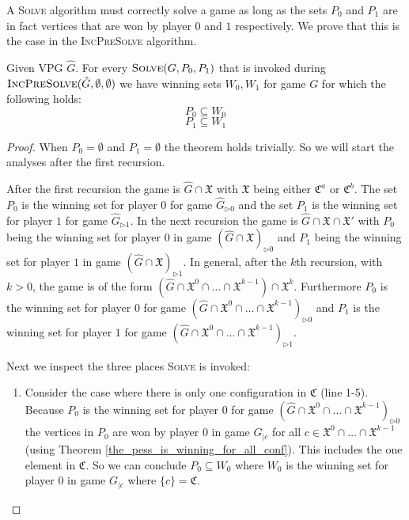 A \textsc{Solve} algorithm must correctly solve a game as long as the sets $P_0$ and $P_1$ are in fact vertices that are won by player $0$ and $1$ respectively. We prove that this is the case in the \textsc{IncPreSolve} algorithm.
\begin{theorem}
	Given VPG $\hat{G}$. For every $\textsc{Solve}(G,P_0,P_1)$ that is invoked during $\textsc{IncPreSolve}(\hat{G},\emptyset,\emptyset)$ we have winning sets $W_0,W_1$ for game $G$ for which the following holds:
	\[ P_0 \subseteq  W_0 \]
	\[ P_1 \subseteq  W_1 \]
	\begin{proof}
		When $P_0 = \emptyset$ and $P_1 = \emptyset$ the theorem holds trivially. So we will start the analyses after the first recursion. 
		
		After the first recursion the game is $\hat{G} \cap \mathfrak{X}$ with $\mathfrak{X}$ being either $\mathfrak{C}^a$ or $\mathfrak{C}^b$. The set $P_0$ is the winning set for player $0$ for game $\hat{G}_{\triangleright0}$ and the set $P_1$ is the winning set for player $1$ for game $\hat{G}_{\triangleright1}$. In the next recursion the game is $\hat{G} \cap \mathfrak{X} \cap \mathfrak{X}'$ with $P_0$ being the winning set for player $0$ in game $(\hat{G} \cap \mathfrak{X})_{\triangleright0}$ and $P_1$ being the winning set for player $1$ in game $(\hat{G} \cap \mathfrak{X})_{\triangleright1}$. In general, after the $k$th recursion, with $k > 0$, the game is of the form  $(\hat{G} \cap \mathfrak{X}^0 \cap \dots \cap \mathfrak{X}^{k-1}) \cap \mathfrak{X}^k$. Furthermore $P_0$ is the winning set for player $0$ for game $(\hat{G} \cap \mathfrak{X}^0 \cap \dots \cap \mathfrak{X}^{k-1})_{\triangleright0}$ and $P_1$ is the winning set for player $1$ for game $(\hat{G} \cap \mathfrak{X}^0 \cap \dots \cap \mathfrak{X}^{k-1})_{\triangleright1}$.
		
		Next we inspect the three places \textsc{Solve} is invoked:
		\begin{enumerate}
			\item Consider the case where there is only one configuration in $\mathfrak{C}$ (line 1-5). Because $P_0$ is the winning set for player $0$ for game $(\hat{G} \cap \mathfrak{X}^0 \cap \dots \cap \mathfrak{X}^{k-1})_{\triangleright0}$ the vertices in $P_0$ are won by player $0$ in game $G_{|c}$ for all $c \in \mathfrak{X}^0 \cap \dots \cap \mathfrak{X}^{k-1}$ (using Theorem \ref{the_pess_is_winning_for_all_conf}). This includes the one element in $\mathfrak{C}$. So we can conclude $P_0 \subseteq W_0$ where $W_0$ is the winning set for player $0$ in game $G_{|c}$ where $\{c\} = \mathfrak{C}$.
			

\end{enumerate}
\end{proof}
\end{theorem}
